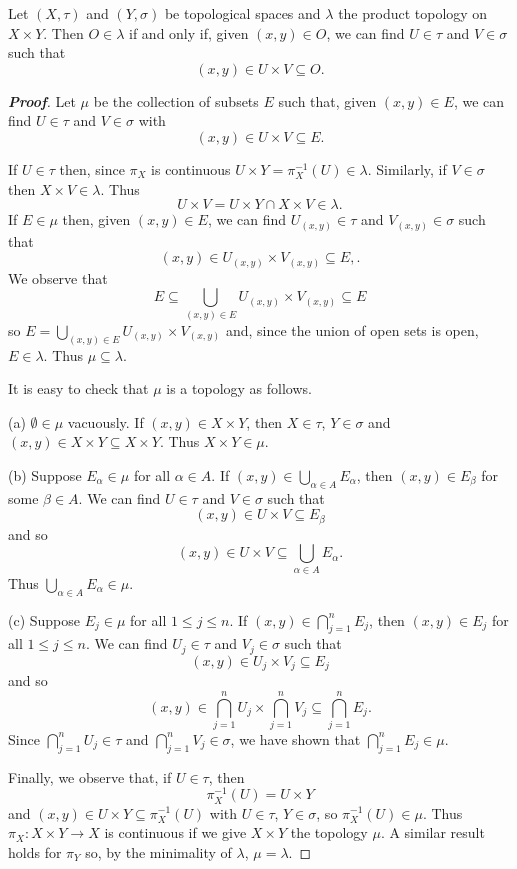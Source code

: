 \begin{lemma}\label{L;product topology}
Let $(X,\tau)$ and $(Y,\sigma)$
be topological spaces and $\lambda$ the product topology
on $X\times Y$.
Then $O\in\lambda$ if and only if, given $(x,y)\in O$,
we can find $U\in \tau$ and $V\in \sigma$ such that
\[(x,y)\in U\times V\subseteq O.\]
\end{lemma}
\begin{proof}[\bf Proof] Let $\mu$ be the collection of subsets
$E$ such that, given $(x,y)\in E$,
we can find $U\in \tau$ and $V\in \sigma$ with
\[(x,y)\in U\times V\subseteq E.\]

If $U\in \tau$ then, since $\pi_{X}$ is continuous
$U\times Y=\pi_{X}^{-1}(U)\in\lambda$. Similarly,
if $V\in\sigma$ then $X\times V\in\lambda$. Thus
\[U\times V=U\times Y\cap X\times V\in\lambda.\]
If $E\in\mu$ then, given $(x,y)\in E$, we can find
$U_{(x,y)}\in \tau$ and $V_{(x,y)}\in \sigma$ such that
\[(x,y)\in U_{(x,y)}\times V_{(x,y)}\subseteq E,.\]
We observe that
\[E\subseteq \bigcup_{(x,y)\in E}U_{(x,y)}\times V_{(x,y)}\subseteq E\]
so $E=\bigcup_{(x,y)\in E}U_{(x,y)}\times V_{(x,y)}$ and, since the
union of open sets is open, $E\in\lambda$. Thus $\mu\subseteq\lambda$.

It is easy to check that $\mu$ is a topology as follows.

(a) $\emptyset\in\mu$ vacuously. If $(x,y)\in X\times Y$,
then $X\in\tau$, $Y\in\sigma$ and
$(x,y)\in X\times Y\subseteq X\times Y$. Thus $X\times Y\in\mu$.

(b) Suppose $E_{\alpha}\in\mu$ for all $\alpha\in A$.
If $(x,y)\in\bigcup_{\alpha\in A}E_{\alpha}$,
then $(x,y)\in E_{\beta}$ for some $\beta\in A$.
We can find $U\in \tau$ and $V\in \sigma$ such that
\[(x,y)\in U\times V\subseteq E_{\beta}\]
and so
\[(x,y)\in U\times V\subseteq\bigcup_{\alpha\in A}E_{\alpha}.\]
Thus $\bigcup_{\alpha\in A}E_{\alpha}\in\mu$.

(c) Suppose $E_{j}\in\mu$ for all $1\leq j\leq n$.
If $(x,y)\in\bigcap_{j=1}^{n}E_{j}$,
then $(x,y)\in E_{j}$ for all $1\leq j\leq n$.
We can find $U_{j}\in \tau$ and $V_{j}\in \sigma$ such that
\[(x,y)\in U_{j}\times V_{j}\subseteq E_{j}\]
and so
\[(x,y)\in \bigcap_{j=1}^{n} U_{j}\times \bigcap_{j=1}^{n} V_{j}
\subseteq\bigcap_{j=1}^{n}E_{j}.\]
Since $\bigcap_{j=1}^{n} U_{j}\in\tau$
and $\bigcap_{j=1}^{n} V_{j}\in\sigma$,
we have shown that $\bigcap_{j=1}^{n}E_{j}\in\mu$.

Finally, we observe that, if $U\in\tau$, then
\[\pi_{X}^{-1}(U)=U\times Y\]
and $(x,y)\in U\times Y\subseteq \pi_{X}^{-1}(U)$
with $U\in\tau$, $Y\in\sigma$,
so $\pi_{X}^{-1}(U)\in\mu$. Thus $\pi_{X}:X\times Y\rightarrow X$
is continuous if we give $X\times Y$ the topology $\mu$. A similar
result holds for $\pi_{Y}$ so, by the minimality of $\lambda$,
$\mu=\lambda$.
\end{proof}


